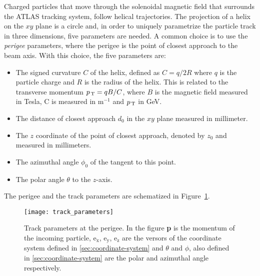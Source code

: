 Charged particles that move through the solenoidal magnetic field that surrounds
the ATLAS tracking system, follow helical trajectories. The projection of a
helix on the $xy$ plane is a circle and, in order to uniquely parametrize the
particle track in three dimensions, five parameters are needed. A common choice
is to use the \emph{perigee} parameters, where the perigee is the point of
closest approach to the beam axis. With this choice, the five parameters are:
\begin{itemize}
\item The signed curvature $C$ of the helix, defined as $C = q / 2R$ where $q$
  is the particle charge and $R$ is the radius of the helix. This is related to
  the transverse momentum $p_\mathrm{\, T} = qB / C$, where $B$ is the magnetic field
  measured in Tesla, C is measured in m$^{-1}$ and $p_\mathrm{\, T}$ in GeV.
\item The distance of closest approach $d_0$ in the $xy$ plane measured in
  millimeter.
\item The $z$ coordinate of the point of closest approach, denoted by $z_0$ and
  measured in millimeters.
\item The azimuthal angle $\phi_0$ of the tangent to this point.
\item The polar angle $\theta$ to the $z$-axis.
\end{itemize}
The perigee and the track parameters are schematized in
Figure~\ref{fig:track_par}.
\begin{figure}[!h]
  \centering
    \texttt{[image: track\_parameters]}
    \caption{Track parameters at the perigee. In the figure \textbf{p} is the
      momentum of the incoming particle, e$_\mathrm{x}$, e$_\mathrm{y}$,
      e$_\mathrm{z}$ are the versors of the coordinate system defined in
      \cref{sec:coordinate-system} and $\theta$ and $\phi$, also defined in
      \cref{sec:coordinate-system} are the polar and azimuthal angle
      respectively.}
    \label{fig:track_par}
\end{figure}
